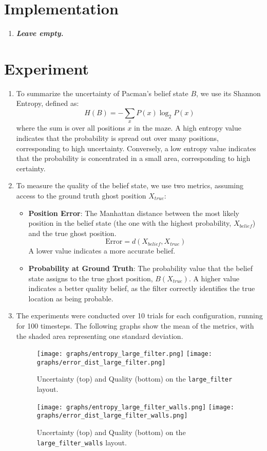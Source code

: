 \documentclass{article}
\begin{document}
\section{Implementation}

\begin{enumerate}[label=\alph*.,leftmargin=*]
    \item \textbf{\textit{Leave empty.}}
\end{enumerate}

\section{Experiment}

\begin{enumerate}[label=\alph*.,leftmargin=*]
    \item To summarize the uncertainty of Pacman's belief state $B$, we use its Shannon Entropy, defined as:
    $$ H(B) = - \sum_{x} P(x) \log_2 P(x) $$
    where the sum is over all positions $x$ in the maze. A high entropy value indicates that the probability is spread out over many positions, corresponding to high uncertainty. Conversely, a low entropy value indicates that the probability is concentrated in a small area, corresponding to high certainty.
    \item To measure the quality of the belief state, we use two metrics, assuming access to the ground truth ghost position $X_{true}$:
    \begin{itemize}
        \item \textbf{Position Error}: The Manhattan distance between the most likely position in the belief state (the one with the highest probability, $X_{belief}$) and the true ghost position.
        $$ \text{Error} = d(X_{belief}, X_{true}) $$
        A lower value indicates a more accurate belief.
        \item \textbf{Probability at Ground Truth}: The probability value that the belief state assigns to the true ghost position, $B(X_{true})$. A higher value indicates a better quality belief, as the filter correctly identifies the true location as being probable.
    \end{itemize}
    \item The experiments were conducted over 10 trials for each configuration, running for 100 timesteps. The following graphs show the mean of the metrics, with the shaded area representing one standard deviation.
    \begin{figure}[h!]
        \centering
        \texttt{[image: graphs/entropy\_large\_filter.png]}
        \texttt{[image: graphs/error\_dist\_large\_filter.png]}
        \caption{Uncertainty (top) and Quality (bottom) on the \texttt{large\_filter} layout.}
    \end{figure}
    \begin{figure}[h!]
        \centering
        \texttt{[image: graphs/entropy\_large\_filter\_walls.png]}
        \texttt{[image: graphs/error\_dist\_large\_filter\_walls.png]}
        \caption{Uncertainty (top) and Quality (bottom) on the \texttt{large\_filter\_walls} layout.}
    \end{figure}
    

\end{enumerate}
\end{document}
